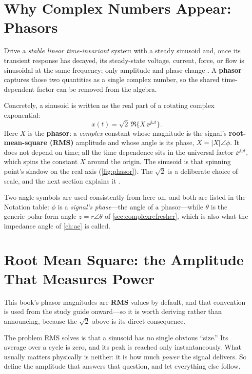 \section{Why Complex Numbers Appear: Phasors}
Drive a \emph{stable linear time-invariant} system with a steady sinusoid and,
once its transient response has decayed, its steady-state voltage, current,
force, or flow is sinusoidal at the same frequency; only amplitude and phase
change \cite[pp.~22--28]{white2004highfrequency}
\cite[pp.~47--48, 54--56]{leigh2012control}. A \textbf{phasor} captures those
two quantities as a single complex number, so the shared time-dependent factor
can be removed from the algebra.

Concretely, a sinusoid is written as the real part of a rotating complex
exponential:
\[
x(t)=\sqrt{2}\,\Re\{X\,\ee^{\jj\omega t}\}.
\]
Here \(X\) is the \textbf{phasor}: a \emph{complex} constant whose magnitude is
the signal's \textbf{root-mean-square (RMS)} amplitude and whose angle is its
phase, \(X=|X|\angle\phi\). It does not depend on time; all the time dependence
sits in the universal factor \(\ee^{\jj\omega t}\), which spins the constant
\(X\) around the origin. The sinusoid is that spinning point's shadow on the real
axis (\cref{fig:phasor}). The \(\sqrt2\) is a deliberate choice of scale, and
the next section explains it \cite[pp.~17, 27]{white2004highfrequency}.

Two angle symbols are used consistently from here on, and both are listed in the
Notation table: \(\phi\) is a \emph{signal's phase}---the angle of a phasor---while
\(\theta\) is the generic polar-form angle \(z=r\angle\theta\) of
\cref{sec:complexrefresher}, which is also what the impedance angle of
\cref{ch:ac} is called.

\section{Root Mean Square: the Amplitude That Measures Power}
\label{sec:rms}
This book's phasor magnitudes are \textbf{RMS} values by default, and that
convention is used from the study guide onward---so it is worth deriving rather
than announcing, because the \(\sqrt2\) above is its direct consequence.

The problem RMS solves is that a sinusoid has no single obvious ``size.'' Its
average over a cycle is zero, and its peak is reached only instantaneously. What
usually matters physically is neither: it is how much \emph{power} the signal
delivers. So define the amplitude that answers that question, and let everything
else follow.

